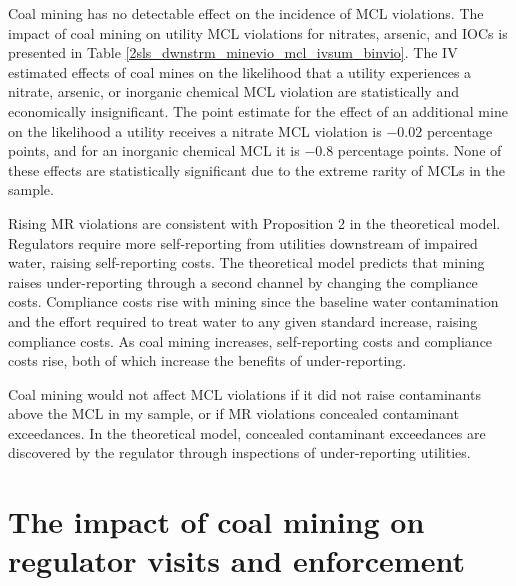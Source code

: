\documentclass[12pt]{article}
\begin{document}
Coal mining has no detectable effect on the incidence of MCL violations. The impact of coal mining on utility MCL violations for nitrates, arsenic, and IOCs is presented in Table \ref{2sls_dwnstrm_minevio_mcl_ivsum_binvio}. The IV estimated effects of coal mines on the likelihood that a utility experiences a nitrate, arsenic, or inorganic chemical MCL violation are statistically and economically insignificant. The point estimate for the effect of an additional mine on the likelihood a utility receives a nitrate MCL violation is $-0.02$ percentage points, and for an inorganic chemical MCL it is $-0.8$ percentage points. None of these effects are statistically significant due to the extreme rarity of MCLs in the sample.

Rising MR violations are consistent with Proposition 2 in the theoretical model. Regulators require more self-reporting from utilities downstream of impaired water, raising self-reporting costs. The theoretical model predicts that mining raises under-reporting through a second channel by changing the compliance costs. Compliance costs rise with mining since the baseline water contamination and the effort required to treat water to any given standard increase, raising compliance costs. As coal mining increases, self-reporting costs and compliance costs rise, both of which increase the benefits of under-reporting. 


Coal mining would not affect MCL violations if it did not raise contaminants above the MCL in my sample, or if MR violations concealed contaminant exceedances. In the theoretical model, concealed contaminant exceedances are discovered by the regulator through inspections of under-reporting utilities. 

\section{The impact of coal mining on regulator visits and enforcement}\label{sec:enforcement}
\end{document}

